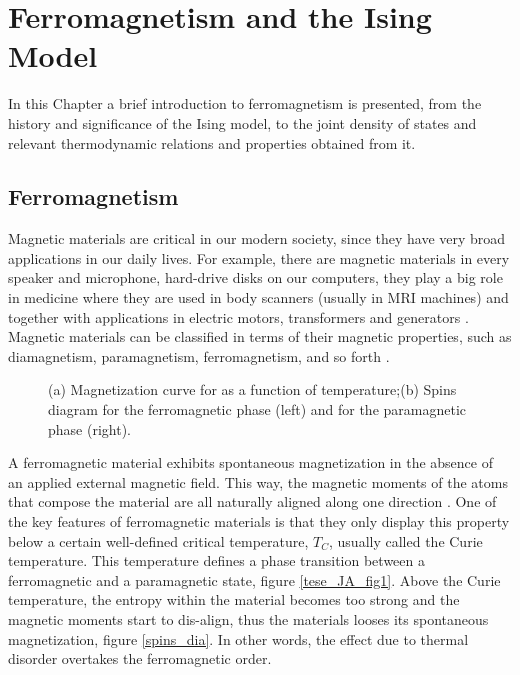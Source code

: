 \chapter{Ferromagnetism and the Ising Model}

In this Chapter  a brief introduction to ferromagnetism is presented, from the history and significance of the Ising model, to the joint density of states and relevant thermodynamic relations and properties obtained from it.

\section{Ferromagnetism}

Magnetic materials are critical in our modern society, since they have very broad applications in our daily lives. For example, there are magnetic materials in every speaker and microphone, hard-drive disks on our computers, they play a big role in medicine where they are used in body scanners (usually in MRI machines) and together with applications in electric motors, transformers and generators \cite{Gutfleisch2011}. Magnetic materials can be classified in terms of their magnetic properties, such as diamagnetism, paramagnetism, ferromagnetism, and so forth \cite{Griffiths}. 

\begin{figure}[ht]
\centering
{}
\quad
\quad
\quad
{}

\caption{(a) Magnetization curve for  as a function of temperature;(b) Spins diagram for the ferromagnetic phase (left) and for the paramagnetic phase (right).}

\end{figure}

A ferromagnetic material exhibits spontaneous magnetization in the absence of an applied external magnetic field. This way, the magnetic moments of the atoms that compose the material are all naturally aligned along one direction \cite{magnetism_book}. One of the key features of ferromagnetic materials is that they only display this property below a certain well-defined critical temperature, $T_C$, usually called the Curie temperature. This temperature defines a phase transition between a ferromagnetic and a paramagnetic state, figure \ref{tese_JA_fig1}. 
Above the Curie temperature, the entropy within the material becomes too strong and the magnetic moments start to dis-align, thus the materials looses its spontaneous magnetization, figure \ref{spins_dia}.  In other words, the effect due to thermal disorder overtakes the ferromagnetic order.

